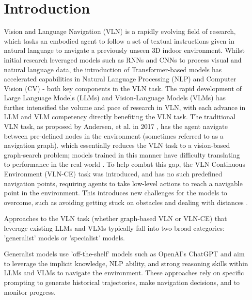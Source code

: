 \documentclass{svproc}
\begin{document}
\section{Introduction}
    Vision and Language Navigation (VLN) is a rapidly evolving field of research, which tasks an embodied agent to follow a set of textual instructions given in natural language to navigate a previously unseen 3D indoor environment. Whilst initial research leveraged models such as RNNs and CNNs to process visual and natural language data, the introduction of Transformer-based models \cite{attenion_is_all_you_need} has accelerated capabilities in Natural Language Processing (NLP) and Computer Vision (CV) - both key components in the VLN task. The rapid development of Large Language Models (LLMs) and Vision-Language Models (VLMs) has further intensified the volume and pace of research in VLN, with each advance in LLM and VLM competency directly benefiting the VLN task.
    The traditional VLN task, as proposed by Andersen, et al. in 2017 \cite{8578485}, has the agent navigate between pre-defined nodes in the environment (sometimes referred to as a navigation graph), which essentially reduces the VLN task to a vision-based graph-search problem; models trained in this manner have difficulty translating to performance in the real-world \cite{pmlr-v155-anderson21a}. To help combat this gap, the VLN Continuous Environment (VLN-CE) task was introduced, and has no such predefined navigation points, requiring agents to take low-level actions to reach a navigable point in the environment. This introduces new challenges for the models to overcome, such as avoiding getting stuck on obstacles and dealing with distances \cite{krantz2020navgraphvisionandlanguagenavigationcontinuous}.
    \newline \par
    Approaches to the VLN task (whether graph-based VLN or VLN-CE) that leverage existing LLMs and VLMs typically fall into two broad categories: 'generalist' models or 'specialist' models.
    \par
    Generalist models \cite{long2023_discussnav, chen2024mapgptmapguidedpromptingadaptive, zhou2023navgptexplicitreasoningvisionandlanguage} use 'off-the-shelf' models such as OpenAI's ChatGPT \cite{openai2024gpt4technicalreport} and aim to leverage the implicit knowledge, NLP ability, and strong reasoning skills within LLMs and VLMs \cite{51647, LMs_as_knowledge_bases} to navigate the environment. These approaches rely on specific prompting to generate historical trajectories, make navigation decisions, and to monitor progress.
\end{document}
